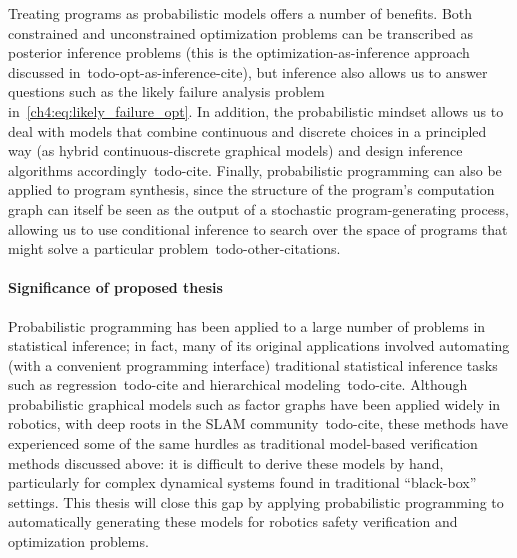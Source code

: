 Treating programs as probabilistic models offers a number of benefits. Both constrained and unconstrained optimization problems can be transcribed as posterior inference problems (this is the optimization-as-inference approach discussed in~\cite{maSamplingCanBe2019}todo-opt-as-inference-cite), but inference also allows us to answer questions such as the likely failure analysis problem in~\eqref{ch4:eq:likely_failure_opt}. In addition, the probabilistic mindset allows us to deal with models that combine continuous and discrete choices in a principled way (as hybrid continuous-discrete graphical models) and design inference algorithms accordingly~todo-cite. Finally, probabilistic programming can also be applied to program synthesis, since the structure of the program's computation graph can itself be seen as the output of a stochastic program-generating process, allowing us to use conditional inference to search over the space of programs that might solve a particular problem~\cite{cusumano-townerAutomatingInvolutiveMCMC2020}todo-other-citations.

\paragraph{Significance of proposed thesis} Probabilistic programming has been applied to a large number of problems in statistical inference; in fact, many of its original applications involved automating (with a convenient programming interface) traditional statistical inference tasks such as regression~todo-cite and hierarchical modeling~todo-cite. Although probabilistic graphical models such as factor graphs have been applied widely in robotics, with deep roots in the SLAM community~todo-cite, these methods have experienced some of the same hurdles as traditional model-based verification methods discussed above: it is difficult to derive these models by hand, particularly for complex dynamical systems found in traditional ``black-box'' settings. This thesis will close this gap by applying probabilistic programming to automatically generating these models for robotics safety verification and optimization problems.